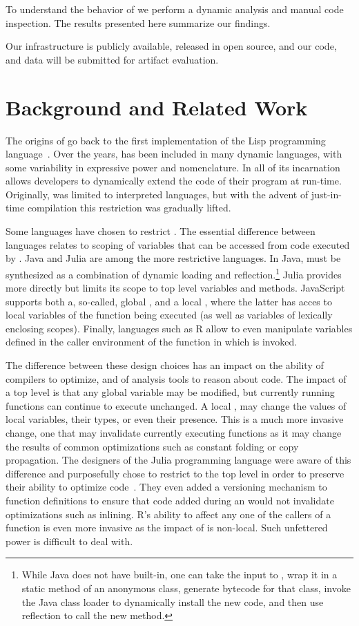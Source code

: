 \documentclass[USenglish,cleveref, autoref, thm-restate]{lipics-v2019}
\begin{document}
To understand the behavior of \eval we perform a dynamic analysis and manual
code inspection. The results presented here summarize our findings.

Our infrastructure is publicly available, released in open source, and our
code, and data will be submitted for artifact evaluation.


\section{Background and Related Work}

The origins of \eval go back to the first implementation of the Lisp
programming language~\cite{lisp}. Over the years, \eval has been included in
many dynamic languages, with some variability in expressive power and
nomenclature. In all of its incarnation \eval allows developers to
dynamically extend the code of their program at run-time.  Originally, \eval
was limited to interpreted languages, but with the advent of just-in-time
compilation this restriction was gradually lifted.

Some languages have chosen to restrict \eval. The essential difference
between languages relates to scoping of variables that can be accessed from
code executed by \eval.  Java and Julia are among the more restrictive
languages. In Java, \eval must be synthesized as a combination of dynamic
loading and reflection.\footnote{While Java does not have \eval built-in,
  one can take the input to \eval, wrap it in a static method of an
  anonymous class, generate bytecode for that class, invoke the Java class
  loader to dynamically install the new code, and then use reflection to
  call the new method.} Julia provides \eval more directly but limits its
scope to top level variables and methods. JavaScript supports both a,
so-called, global \eval, and a local \eval, where the latter has acces to
local variables of the function being executed (as well as variables of
lexically enclosing scopes). Finally, languages such as R allow \eval to
even manipulate variables defined in the caller environment of the function in
which \eval is invoked.

The difference between these design choices has an impact on the ability of
compilers to optimize, and of analysis tools to reason about code. The
impact of a top level \eval is that any global variable may be modified, but
currently running functions can continue to execute unchanged. A local
\eval, may change the values of local variables, their types, or even their
presence. This is a much more invasive change, one that may invalidate
currently executing functions as it may change the results of common
optimizations such as constant folding or copy propagation. The designers of
the Julia programming language were aware of this difference and
purposefully chose to restrict \eval to the top level in order to preserve
their ability to optimize code~\cite{oopsla18a}. They even added a
versioning mechanism to function definitions to ensure that code added
during an \eval would not invalidate optimizations such as inlining.  R's
ability to affect any one of the callers of a function is even more invasive
as the impact of \eval is non-local. Such unfettered power is difficult to
deal with.
\end{document}
